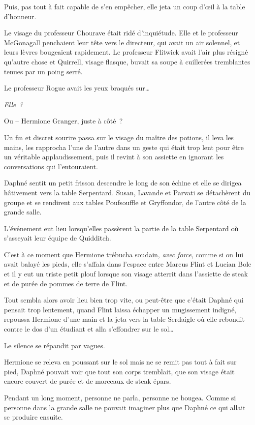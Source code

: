 Puis, pas tout à fait capable de s'en empêcher, elle jeta un coup d'œil à la table d'honneur.

Le visage du professeur Chourave était ridé d'inquiétude. Elle et le professeur McGonagall penchaient leur tête vers le directeur, qui avait un air solennel, et leurs lèvres bougeaient rapidement. Le professeur Flitwick avait l'air plus résigné qu'autre chose et Quirrell, visage flasque, buvait sa soupe à cuillerées tremblantes tenues par un poing serré.

Le professeur Rogue avait les yeux braqués sur…

\emph{Elle~?}

Ou -- Hermione Granger, juste à côté~?

Un fin et discret sourire passa sur le visage du maître des potions, il leva les mains, les rapprocha l'une de l'autre dans un geste qui était trop lent pour être un véritable applaudissement, puis il revint à son assiette en ignorant les conversations qui l'entouraient.

Daphné sentit un petit frisson descendre le long de son échine et elle se dirigea hâtivement vers la table Serpentard. Susan, Lavande et Parvati se détachèrent du groupe et se rendirent aux tables Poufsouffle et Gryffondor, de l'autre côté de la grande salle.

L'événement eut lieu lorsqu'elles passèrent la partie de la table Serpentard où s'asseyait leur équipe de Quidditch.

C'est à ce moment que Hermione trébucha soudain, \emph{avec force}, comme si on lui avait balayé les pieds, elle s'affala dans l'espace entre Marcus Flint et Lucian Bole et il y eut un triste petit plouf lorsque son visage atterrit dans l'assiette de steak et de purée de pommes de terre de Flint.

Tout sembla alors avoir lieu bien trop vite, ou peut-être que c'était Daphné qui pensait trop lentement, quand Flint laissa échapper un mugissement indigné, repoussa Hermione d'une main et la jeta vers la table Serdaigle où elle rebondit contre le dos d'un étudiant et alla s'effondrer sur le sol…

Le silence se répandit par vagues.

Hermione se releva en poussant sur le sol mais ne se remit pas tout à fait sur pied, Daphné pouvait voir que tout son corps tremblait, que son visage était encore couvert de purée et de morceaux de steak épars.

Pendant un long moment, personne ne parla, personne ne bougea. Comme si personne dans la grande salle ne pouvait imaginer plus que Daphné ce qui allait se produire ensuite.

